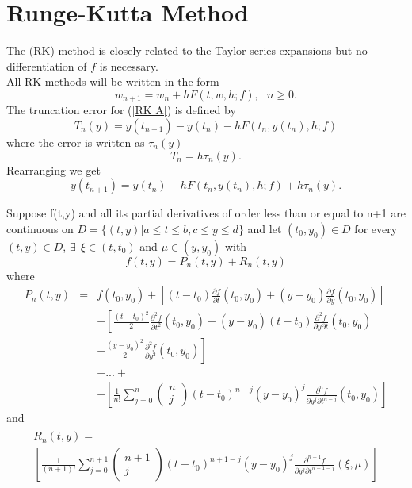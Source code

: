 \chapter{Runge-Kutta Method}
The  (RK) method is closely related to the Taylor series expansions but no differentiation of $f$ is necessary.\\
All RK methods will be written in the form
\begin{equation}
\label{RK A}
w_{n+1} =w_n +hF(t,w,h;f), \ \ \ n\geq 0.
\end{equation}
The truncation error for (\ref{RK A}) is defined by
\[
T_{n}(y) =y(t_{n+1})-y(t_n) -hF(t_n,y(t_n),h;f) 
\]
where the error is written as $\tau_n(y)$ 
\[ T_n=h\tau_n(y).\]
Rearranging we get
\[
y(t_{n+1})=y(t_n) -h F(t_n,y(t_n),h;f) +
h\tau_n(y).\]


\begin{theorem} \label{RK_Theorem}
Suppose f(t,y) and all its partial derivatives of order less than or equal to
n+1 are continuous on $D=\{(t,y)|a\leq t \leq b, c \leq y \leq d \}$ and let 
$(t_0,y_0)\in D$ for every $(t,y)\in D$, $\exists \ \ \xi \in (t,t_0)$ and $\mu \in (y,y_0)$ with
\[f(t,y) = P_n(t,y) + R_n(t,y) \]
where
\begin{eqnarray*}
 P_n(t,y) &=& f(t_0,y_0)+\left[(t-t_0)\frac{\partial f}{\partial t}(t_0,y_0)+(y-y_0)\frac{\partial f}{\partial y}(t_0,y_0) \right]\\
& & + \left[\frac{(t-t_0)^2}{2}\frac{\partial^2 f}{\partial t^2}(t_0,y_0)+(y-y_0)(t-t_0)\frac{\partial^2 f}{\partial y\partial t}(t_0,y_0)\right. \\
& & +\left. \frac{(y-y_0)^2}{2}\frac{\partial^2 f}{\partial y^2}(t_0,y_0) \right]\\
& & +...+\\
& & + \left[\frac{1}{n!}\sum_{j=0}^n\left(\begin{array}{c}n \\ j \end{array}\right)(t-t_0)^{n-j}(y-y_0)^j\frac{\partial^n f}{\partial y^j\partial t^{n-j}}(t_0,y_0)  \right]
\end{eqnarray*}
and
\begin{eqnarray*}\begin{aligned}R_n(t,y) = \\\left[\frac{1}{(n+1)!}\sum_{j=0}^{n+1}\left(\begin{array}{c}n+1 \\ j \end{array}\right)(t-t_0)^{n+1-j}(y-y_0)^j\frac{\partial^{n+1} f}{\partial y^j\partial t^{n+1-j}}(\xi,\mu)  \right]\end{aligned}
\end{eqnarray*}
\end{theorem}
